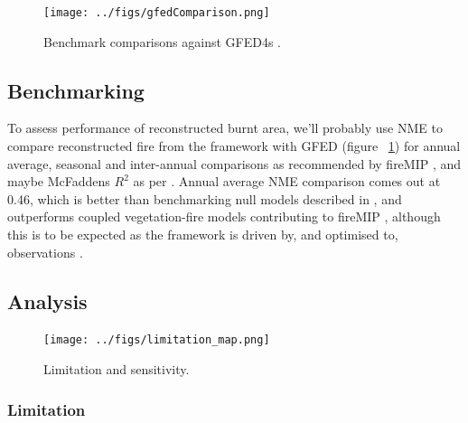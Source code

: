 
\begin{figure}[!ht]
  \centering
    \texttt{[image: ../figs/gfedComparison.png]}
  \caption{Benchmark comparisons against GFED4s \citep{Giglio2013}.}
  \label{fig:benchmark}
\end{figure}

\subsection{Benchmarking}
\begin{shaded}
To assess performance of reconstructed burnt area, we'll probably use NME to compare reconstructed fire from the framework with GFED (figure ~\ref{fig:benchmark}) for annual average, seasonal and inter-annual comparisons \citep{kelley2013comprehensive} as recommended by fireMIP \citet{gmd-2016-237, hantson2016status}, and maybe McFaddens $R^{2}$ as per \citep{bistinas2014causal}. Annual average NME comparison comes out at 0.46, which is better than benchmarking null models described in \citet{kelley2013comprehensive}, and outperforms coupled vegetation-fire models contributing to fireMIP \citep{hantson2016status}, although this is to be expected as the framework is driven by, and optimised to, observations \citep{kelley2013comprehensive}.

\end{shaded}


\subsection{Analysis}


\begin{figure}[!ht]
  \centering
    \texttt{[image: ../figs/limitation\_map.png]}

  \caption{Limitation and sensitivity.}
  \label{fig:lim_sen_maps}
\end{figure}


\subsubsection{Limitation}

